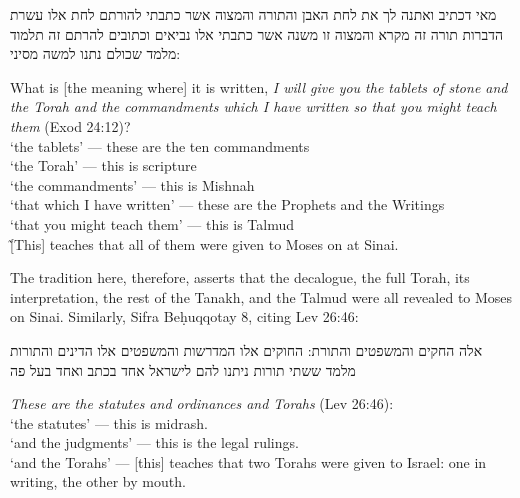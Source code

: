 \begin{aramaictext}
    מאי דכתיב ואתנה לך את לחת האבן והתורה והמצוה אשר כתבתי להורתם לחת אלו עשרת הדברות תורה זה מקרא והמצוה זו משנה אשר כתבתי אלו נביאים וכתובים להרתם זה תלמוד מלמד שכולם נתנו למשה מסיני: 
\end{aramaictext}

\begin{translation}
    What is [the meaning where] it is written, \emph{I will give you the tablets of stone and the Torah and the commandments which I have written so that you might teach them} (Exod 24:12)?\\
    \-\hspace{2em}`the tablets' --- these are the ten commandments\\
    \-\hspace{2em}`the Torah' --- this is scripture\\
    \-\hspace{2em}`the commandments' --- this is Mishnah\\
    \-\hspace{2em}`that which I have written' --- these are the Prophets and the Writings\\
    \-\hspace{2em}`that you might teach them' --- this is Talmud\\\~
    [This] teaches that all of them were given to Moses on at Sinai.
\end{translation}

\noindent
The tradition here, therefore, asserts that the decalogue, the full Torah, its interpretation, the rest of the Tanakh, and the Talmud were all revealed to Moses on Sinai. Similarly, Sifra Beḥuqqotay 8, citing Lev 26:46:
\begin{aramaictext}
    אלה החקים והמשפטים והתורת: החוקים אלו המדרשות והמשפטים אלו הדינים והתורות מלמד ששתי תורות ניתנו להם לישראל אחד בכתב ואחד בעל פה
\end{aramaictext}
\begin{translation}
    \emph{These are the statutes and ordinances and Torahs} (Lev 26:46):\\
    \-\hspace{2em} `the statutes' --- this is midrash.\\
    \-\hspace{2em} `and the judgments' --- this is the legal rulings.\\
    \-\hspace{2em} `and the Torahs' --- [this] teaches that two Torahs were given to Israel: one in writing, the other by mouth.
\end{translation}

